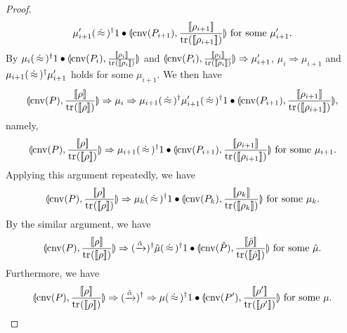 \begin{proof}
\[ \mu'_{i+1} (\,\dot\approx\,)^\dagger 
 1 \bullet
 \llparenthesis \mathrm{cnv}(P_{i+1}), \frac{[\![\rho_{i+1}]\!]}{{\rm tr}_{}([\![\rho_{i+1}]\!])} \rrparenthesis 
 \mbox{ for some } \mu'_{i+1}.
\]
By $\mu_i (\,\dot\approx\,)^\dagger 1 \bullet
 \llparenthesis \mathrm{cnv}(P_i), \frac{[\![\rho_i]\!]}{{\rm tr}_{}([\![\rho_i]\!])} \rrparenthesis$ and
 $\llparenthesis \mathrm{cnv}(P_i), \frac{[\![\rho_i]\!]}{{\rm tr}_{}([\![\rho_i]\!])} \rrparenthesis
 \Rightarrow
 \mu'_{i+1}$, $\mu_i \Rightarrow \mu_{i+1}$ and\\
 $\mu_{i+1} (\,\dot\approx\,)^\dagger \mu'_{i+1}$ holds
 for some $\mu_{i+1}$. We then have
 \[
 \con{\cnv{P}}{\frac{\braw{\rho}}{\tr{}{\braw{\rho}}}} 
 \Rightarrow
 \mu_i
 \Rightarrow
 \mu_{i+1} (\strg)^\dagger \mu'_{i+1} 
 (\strg)^\dagger
 1 \bullet 
\con{\cnv{P_{i+1}}}
    {\frac{\braw{\rho_{i+1}}}{\tr{}{\braw{\rho_{i+1}}}}},
 \]
 namely,
 \[
 \con{\cnv{P}}{\frac{\braw{\rho}}{\tr{}{\braw{\rho}}}} 
 \Rightarrow
 \mu_{i+1} 
 (\strg)^\dagger
 1 \bullet
 \con{\cnv{P_{i+1}}}
     {\frac{\braw{\rho_{i+1}}}{\tr{}{\braw{\rho_{i+1}}}}}
 \mbox{ for some } \mu_{i+1}.
 \]
 Applying this argument repeatedly, we have
 \[
 \con{\cnv{P}}{\frac{\braw{\rho}}{\tr{}{\braw{\rho}}}} 
 \Rightarrow
 \mu_{k} 
 (\strg)^\dagger
 1 \bullet
 \con{\cnv{P_{k}}}
     {\frac{\braw{\rho_{k}}}{\tr{}{\braw{\rho_{k}}}}}
 \mbox{ for some } \mu_{k}.
 \]
By the similar argument, we have
 \[
 \con{\cnv{P}}{\frac{\braw{\rho}}{\tr{}{\braw{\rho}}}} 
 \Rightarrow
 (\xrightarrow{\hat \alpha})^\dagger
 \hat \mu 
 (\strg)^\dagger
 1 \bullet
 \con{\cnv{\hat P}}
     {\frac{\braw{\hat \rho}}{\tr{}{\braw{\hat \rho}}}}
 \mbox{ for some } \hat \mu.
 \]
Furthermore, we have
 \[
 \con{\cnv{P}}{\frac{\braw{\rho}}{\tr{}{\braw{\rho}}}} 
 \Rightarrow
 (\xrightarrow{\hat \alpha})^\dagger
 \Rightarrow
 \mu
 (\strg)^\dagger
 1 \bullet
 \con{\cnv{P'}}
     {\frac{\braw{\rho'}}{\tr{}{\braw{\rho'}}}}
 \mbox{ for some } \mu.
 \]
\end{proof}

